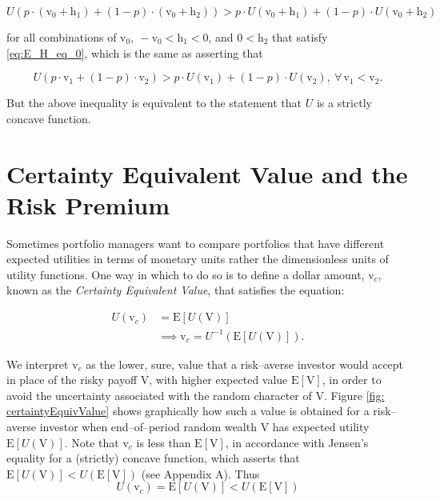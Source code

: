 \documentclass[graybox,envcountchap,sectrefs]{svmono}\usepackage[]{graphicx}\usepackage[]{xcolor}
\begin{document}
\begin{appendices}
\begin{equation}
U\left(p\cdot\left(\mathrm{v}_{0}+\mathrm{h}_{1}\right)+\left(1-p\right)\cdot\left(\mathrm{v}_{0}+\mathrm{h}_{2}\right)\right)>p\cdot U\left(\mathrm{v}_{0}+\mathrm{h}_{1}\right)+\left(1-p\right)\cdot U\left(\mathrm{v}_{0}+\mathrm{h}_{2}\right)\label{eq:E_U_V_0_gt_U_E_V_0}
\end{equation}

for all combinations of $\mathrm{v}_{0},\ -\mathrm{v}_{0}<\mathrm{h}_{1}<0$,
and $0<\mathrm{h}_{2}$ that satisfy \eqref{eq:E_H_eq_0}, which is
the same as asserting that

\begin{equation}
U\left(p\cdot\mathrm{v}_{1}+(1-p)\cdot\mathrm{v}_{2}\right)>p\cdot U\left(\mathrm{v}_{1}\right)+(1-p)\cdot U\left(\mathrm{v}_{2}\right),\ \forall\,\mathrm{v_{1}}<\mathrm{v}_{2}.\label{eq: strictConcavityCondition}
\end{equation}

But the above inequality is equivalent to the statement that $U$
is a strictly concave function. 

\section{Certainty Equivalent Value and the Risk Premium}

Sometimes portfolio managers want to compare portfolios that have
different expected utilities in terms of monetary units rather the
dimensionless units of utility functions. One way in which to do so
is to define a dollar amount, $\mathit{\mathrm{v}}_{c}$, known as
the \emph{Certainty Equivalent Value}, that satisfies the equation: 

\begin{align}
U(\mathit{\mathrm{v}}_{c}) & =\mathrm{E}[U(\mathrm{V})]\nonumber \\
 & \implies\mathit{\mathrm{v}}_{c}=U^{-1}\left(\mathrm{E}[U(\mathrm{V})]\right).\label{eq: certaintyEquivalent}
\end{align}

We interpret $\mathit{\mathrm{v}}_{c}$ as the lower, sure, value
that a risk--averse investor would accept in place of the risky payoff
$\mathrm{V}$, with higher expected value $\mathrm{E}\left[\mathrm{V}\right]$,
in order to avoid the uncertainty associated with the random character
of $\mathrm{V}$. Figure \ref{fig: certaintyEquivValue} shows graphically
how such a value is obtained for a risk--averse investor when end--of--period
random wealth $\mathrm{V}$ has expected utility $\mathrm{E}\left[U(\mathrm{V})\right]$.
Note that $\mathit{\mathrm{v}}_{c}$ is less than $\mathrm{E}\left[\mathrm{V}\right]$,
in accordance with Jensen's equality for a (strictly) concave function,
which asserts that $\mathrm{E}\left[U(\mathrm{V})\right]<U\left(\mathrm{E}\left[\mathrm{V}\right]\right)$
(see Appendix A). Thus
\[
U(\mathrm{v}_{c})=\mathrm{E}\left[U(\mathrm{V})\right]<U\left(\mathrm{E}\left[\mathrm{V}\right]\right)
\]


\end{appendices}
\end{document}

